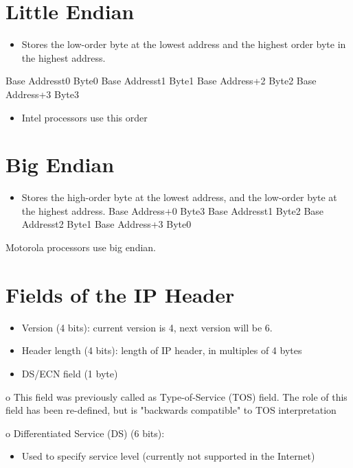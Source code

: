 \documentclass[10pt]{article}
\begin{document}
\section{Little Endian}
\begin{itemize}
  \item Stores the low-order byte at the lowest address and the highest order byte in the highest address.
\end{itemize}

Base Addresst0 Byte0 Base Addresst1 Byte1 Base Address+2 Byte2 Base Address+3 Byte3

\begin{itemize}
  \item Intel processors use this order
\end{itemize}

\section{Big Endian}
\begin{itemize}
  \item Stores the high-order byte at the lowest address, and the low-order byte at the highest address.
Base Address+0 Byte3
Base Addresst1 Byte2
Base Addresst2 Byte1
Base Address+3 Byte0
\end{itemize}

Motorola processors use big endian.

\section*{Fields of the IP Header }


\begin{itemize}
  \item Version (4 bits): current version is 4, next version will be 6.

  \item Header length (4 bits): length of IP header, in multiples of 4 bytes

  \item DS/ECN field (1 byte)

\end{itemize}

o This field was previously called as Type-of-Service (TOS) field. The role of this field has been re-defined, but is "backwards compatible" to TOS interpretation

o Differentiated Service (DS) (6 bits):

\begin{itemize}
  \item Used to specify service level (currently not supported in the Internet)
\end{itemize}
\end{document}
